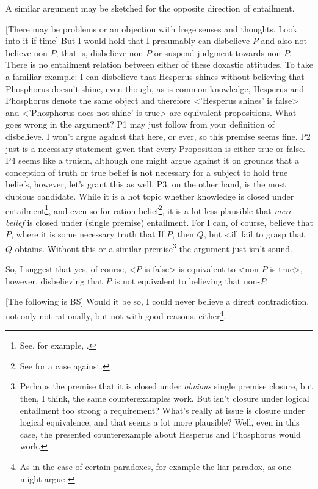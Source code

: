 \documentclass[12pt,numbers=noenddot]{scrartcl}
\begin{document}
A similar argument may be sketched for the opposite direction of entailment.

[There may be problems or an objection with frege senses and thoughts. Look into it if time]
But I would hold that I presumably can disbelieve $P$ and also not believe non-$P$, that is, disbelieve non-$P$ or suspend judgment towards non-$P$. There is no entailment relation between either of these doxastic attitudes. To take a familiar example: I can disbelieve that Hesperus shines without believing that Phosphorus doesn't shine, even though, as is common knowledge, Hesperus and Phosphorus denote the same object and therefore <'Hesperus shines' is false> and <'Phosphorus does not shine' is true> are equivalent propositions. What goes wrong in the argument? P1 may just follow from your definition of disbelieve. I won't argue against that here, or ever, so this premise seems fine. P2 just is a necessary statement given that every Proposition is either true or false. P4 seems like a truism, although one might argue against it on grounds that a conception of truth or true belief is not necessary for a subject to hold true beliefs, however, let's grant this as well. P3, on the other hand, is the most dubious candidate. While it is a hot topic whether knowledge is closed under entailment\footnote{See, for example, \textcite{Dretske2005-DREIKC}.}, and even so for ration belief\footnote{See \textcite{KyburgJr1970-KYBC-2} for a case against.}, it is a lot less plausible that \emph{mere belief} is closed under (single premise) entailment. For I can, of course, believe that $P$, where it is some necessary truth that If $P$, then $Q$, but still fail to grasp that $Q$ obtains. Without this or a similar premise\footnote{Perhaps the premise that it is closed under \emph{obvious} single premise closure, but then, I think, the same counterexamples work. But isn't closure under logical entailment too strong a requirement? What's really at issue is closure under logical equivalence, and that seems a lot more plausible? Well, even in this case, the presented counterexample about Hesperus and Phosphorus would work.} the argument just isn't sound.

So, I suggest that yes, of course, <$P$ is false> is equivalent to <non-$P$ is true>, however, disbelieving that $P$ is not equivalent to believing that non-$P$.

[The following is BS]
Would it be so, I could never believe a direct contradiction, not only not rationally, but not with good reasons, either\footnote{As in the case of certain paradoxes, for example the liar paradox, as one might argue \textcite[415]{Priest1998-PRIWIS}}.
\end{document}
